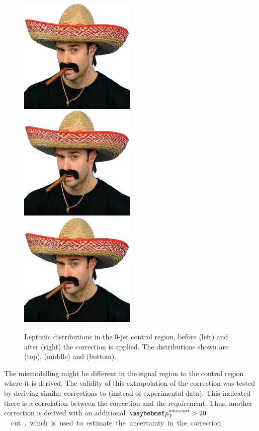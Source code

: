 \begin{figure}[p]
	\hfill
	\includegraphics[width=0.495\textwidth]{tex/motivation/sombrero_comical}
	\\
	\includegraphics[width=0.495\textwidth]{tex/motivation/sombrero_comical}
	\hfill
	\includegraphics[width=0.495\textwidth]{tex/motivation/sombrero_comical}
	\caption{Leptonic distributions in the 0-jet \PZ control region, before (left) and 
	after (right) the \ptZ correction is applied. The distributions shown are \ptll 
	(top), \dphill (middle) and \ptleadlep (bottom).}
	\label{fig:dy:ptZ_reweight}
\end{figure}

The \ptZ mismodelling might be different in the signal region to the \PZ control region 
where it is derived. The validity of this extrapolation of the correction was tested by 
deriving similar corrections to \sherpa (instead of experimental data). This indicated 
there is a correlation between the correction and the \met requirement. Thus, another 
correction is derived with an additional \unit{$\corrtrackmet > 20$}{\GeV} cut, which is 
used to estimate the uncertainty in the correction.



